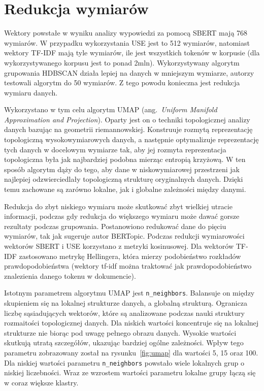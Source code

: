 \section{Redukcja wymiarów}
	Wektory powstałe w wyniku analizy wypowiedzi za pomocą SBERT mają 768 wymiarów.
	W przypadku wykorzystania USE jest to 512 wymiarów, natomiast wektory TF-IDF mają tyle wymiarów,
		ile jest wszystkich tokenów w korpusie (dla wykorzystywanego korpusu jest to ponad 2mln).
	Wykorzystywany algorytm grupowania HDBSCAN działa lepiej na danych w mniejszym wymiarze,
		autorzy testowali algorytm do 50 wymiarów\cite{HDBSCAN}.
	Z tego powodu konieczna jest redukcja wymiaru danych.
	
	Wykorzystano w tym celu algorytm UMAP (ang.\ \emph{Uniform Manifold Approximation and Projection})\cite{UMAP}.
	Oparty jest on o techniki topologicznej analizy danych bazując na geometrii riemannowskiej.
	Konstruuje rozmytą reprezentację topologiczną wysokowymiarowych danych,
		a następnie optymalizuje reprezentację tych danych w docelowym wymiarze tak,
		aby jej rozmyta reprezentacja topologiczna była jak najbardziej podobna mierząc entropią krzyżową.
	W ten sposób algorytm dąży do tego, aby dane w niskowymiarowej przestrzeni jak najlepiej odzwierciedlały topologiczną strukturę oryginalnych danych.
	Dzięki temu zachowane są zarówno lokalne, jak i globalne zależności między danymi.

	Redukcja do zbyt niskiego wymiaru może skutkować zbyt wielkiej utracie informacji,
		podczas gdy redukcja do większego wymiaru może dawać gorsze rezultaty podczas grupowania.
	Postanowiono redukować dane do pięciu wymiarów, tak jak sugeruje autor BERTopic\cite{BERTopic}.
	Podczas redukcji wymiarowości wektorów SBERT i USE korzystano z metryki kosinusowej.
	Dla wektorów TF-IDF zastosowano metrykę Hellingera, która mierzy podobieństwo rozkładów prawdopodobieństwa
		(wektory tf-idf można traktować jak prawdopodobieństwo znalezienia danego tokenu w dokumencie).
	
	Istotnym parametrem algorytmu UMAP jest \verb|n_neighbors|.
	Balansuje on między skupieniem się na lokalnej strukturze danych, a globalną strukturą.
	Ogranicza liczbę sąsiadujących wektorów, które są analizowane podczas nauki struktury rozmaitości topologicznej danych.
	Dla niskich wartości koncentruje się na lokalnej strukturze nie biorąc pod uwagę pełnego obrazu danych.
	Wysokie wartości skutkują utratą szczegółów, ukazując bardziej ogólne zależności.
	Wpływ tego parametru zobrazowany został na rysunku~\ref{fig:umap} dla wartości 5, 15 oraz 100.
	Dla niskiej wartości parametru \verb|n_neighbors| powstało wiele lokalnych grup o niskiej liczebności.
	Wraz ze wzrostem wartości parametru lokalne grupy łączą się w coraz większe klastry.

